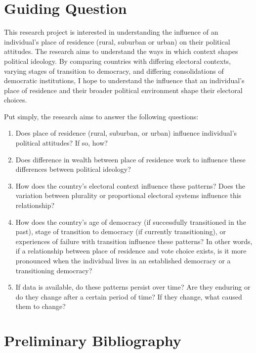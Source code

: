 \documentclass[12pt]{article}
\title{\tb{Place of Residence and Political Attitudes in Democracies Worldwide \\ {\large Research Prospectus} }}
\author{Jennifer Lin}
\affil{Transitions to Democracy}
\begin{document}
\begin{singlespace}
\maketitle
\end{singlespace}

\section{Guiding Question}

This research project is interested in understanding the influence of an individual's place of residence (rural, suburban or urban) on their political attitudes. The research aims to understand the ways in which context shapes political ideology. By comparing countries with differing electoral contexts, varying stages of transition to democracy, and differing consolidations of democratic institutions, I hope to understand the influence that an individual's place of residence and their broader political environment shape their electoral choices.

Put simply, the research aims to answer the following questions:
\begin{enumerate}
\item Does place of residence (rural, suburban, or urban) influence individual's political attitudes? If so, how?
\item Does difference in wealth between place of residence work to influence these differences between political ideology?
\item How does the country's electoral context influence these patterns? Does the variation between plurality or proportional electoral systems influence this relationship?
\item How does the country's age of democracy (if successfully transitioned in the past), stage of transition to democracy (if currently transitioning), or experiences of failure with transition influence these patterns? In other words, if a relationship between place of residence and vote choice exists, is it more pronounced when the individual lives in an established democracy or a transitioning democracy? 
\item If data is available, do these patterns persist over time? Are they enduring or do they change after a certain period of time? If they change, what caused them to change?
\end{enumerate}

\section{Preliminary Bibliography}
\end{document}
